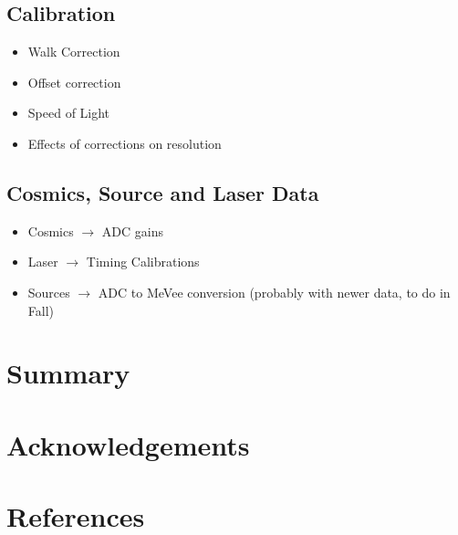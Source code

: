 \documentclass[review]{elsarticle}
\begin{document}
\subsection{Calibration}
\begin{itemize}
\item Walk Correction
\item Offset correction
\item Speed of Light
\item Effects of corrections on resolution
\end{itemize}

\subsection{Cosmics, Source and Laser Data}
\begin{itemize}
\item Cosmics $\rightarrow$ ADC gains
\item Laser $\rightarrow$ Timing Calibrations
\item Sources $\rightarrow$ ADC to MeVee conversion (probably with newer data, to do in Fall)
\end{itemize}

\section{Summary}


\section{Acknowledgements}


\section*{References}

\end{document}
